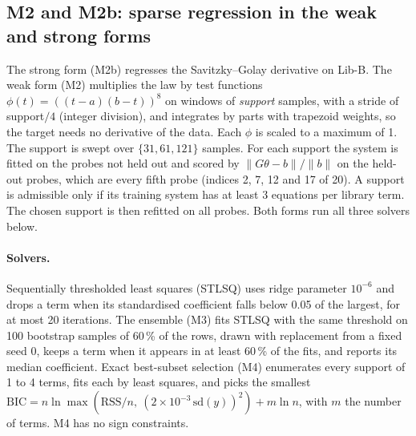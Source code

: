 \subsection*{M2 and M2b: sparse regression in the weak and strong forms}
The strong form (M2b) regresses the Savitzky--Golay derivative on Lib-B. The weak form (M2)
multiplies the law by test functions $\phi(t) = ((t-a)(b-t))^{8}$ on windows of
\emph{support} samples, with a stride of support$/4$ (integer division), and integrates by
parts with trapezoid weights, so the target needs no derivative of the data. Each $\phi$ is
scaled to a maximum of 1. The support is swept over $\{31, 61, 121\}$ samples. For each
support the system is fitted on the probes not held out and scored by
$\|G\theta - b\|/\|b\|$ on the held-out probes, which are every fifth probe (indices 2, 7,
12 and 17 of 20). A support is admissible only if its training system has at least 3
equations per library term. The chosen support is then refitted on all probes. Both forms
run all three solvers below.

\paragraph{Solvers.} Sequentially thresholded least squares (STLSQ) uses ridge parameter
$10^{-6}$ and drops a term when its standardised coefficient falls below 0.05 of the largest,
for at most 20 iterations. The ensemble (M3) fits STLSQ with the same threshold on 100
bootstrap samples of 60\,\% of the rows, drawn with replacement from a fixed seed 0, keeps a
term when it appears in at least 60\,\% of the fits, and reports its median coefficient.
Exact best-subset selection (M4) enumerates every support of 1 to 4 terms, fits each by least
squares, and picks the smallest
$\mathrm{BIC} = n \ln \max(\mathrm{RSS}/n,\ (2\times10^{-3}\,\mathrm{sd}(y))^2) + m \ln n$,
with $m$ the number of terms. M4 has no sign constraints.

